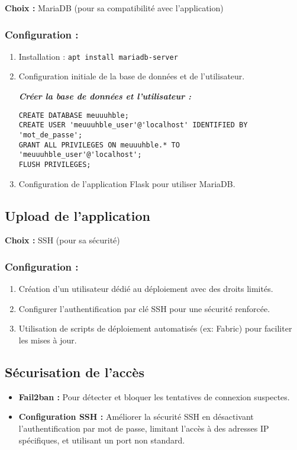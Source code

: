 \textbf{Choix :} MariaDB (pour sa compatibilité avec l'application)

\subsubsection*{Configuration :}

\begin{enumerate}
	\item Installation : \texttt{apt install mariadb-server}
	\item Configuration initiale de la base de données et de l'utilisateur.
	
\textbf{\textit{Créer la base de données et l'utilisateur :}}
\begin{lstlisting}
CREATE DATABASE meuuuhble;
CREATE USER 'meuuuhble_user'@'localhost' IDENTIFIED BY 'mot_de_passe';
GRANT ALL PRIVILEGES ON meuuuhble.* TO 'meuuuhble_user'@'localhost';
FLUSH PRIVILEGES;
\end{lstlisting}


	\item Configuration de l'application Flask pour utiliser MariaDB.
\end{enumerate}

\subsection{Upload de l'application}

\textbf{Choix :} SSH (pour sa sécurité)

\subsubsection*{Configuration :}

\begin{enumerate}
	\item Création d'un utilisateur dédié au déploiement avec des droits limités.
	\item Configurer l'authentification par clé SSH pour une sécurité renforcée.
	\item Utilisation de scripts de déploiement automatisés (ex: Fabric) pour faciliter les mises à jour.
\end{enumerate}

\subsection{Sécurisation de l'accès}

\begin{itemize}
	\item \textbf{Fail2ban :} Pour détecter et bloquer les tentatives de connexion suspectes.
	\item \textbf{Configuration SSH :} Améliorer la sécurité SSH en désactivant l'authentification par mot de passe, limitant l'accès à des adresses IP spécifiques, et utilisant un port non standard.
\end{itemize}


